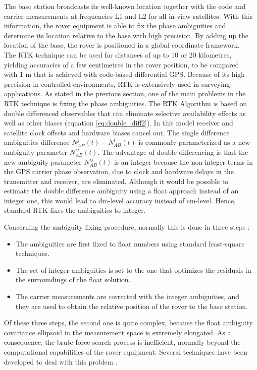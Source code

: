 The base station broadcasts its well-known location together with the code and carrier measurements at frequencies L1 and L2 for all in-view satellites. With this information, the rover equipment is able to fix the phase ambiguities and determine its location relative to the base with high precision. By adding up the location of the base, the rover is positioned in a global coordinate framework.
The RTK technique can be used for distances of up to 10 or 20 kilometres, yielding accuracies of a few centimetres in the rover position, to be compared with 1 m that is achieved with code-based differential GPS. Because of its high precision in controlled environments, RTK is extensively used in surveying applications.
As stated in the previous section, one of the main problems in the RTK technique is fixing the phase ambiguities. The RTK Algorithm is based on double differenced observables that can eliminate selective availability effects as well as other biases (equation \ref{eq:double_diff2}). In this model receiver and satellite clock offsets and hardware biases cancel out. The single difference ambiguities difference $N_{AB}^{j}(t)-N_{AB}^{i}(t)$ is commonly parameterized as a new ambiguity parameter $N_{AB}^{ij}(t)$. The advantage of double differencing is that the new ambiguity parameter $N_{AB}^{ij}(t)$ is an integer because the non-integer terms in the GPS carrier phase observation, due to clock and hardware delays in the transmitter and receiver, are eliminated.
Although it would be possible to estimate the double difference ambiguity using a float approach instead of an integer one, this would lead to dm-level accuracy instead of cm-level. Hence, standard RTK fixes the ambiguities to integer.

Concerning the ambiguity fixing procedure, normally this is done in three steps \cite{Eissfeller:2002}:
\begin{itemize}
\item The ambiguities are first fixed to float numbers using standard least-square techniques.
\item The set of integer ambiguities is set to the one that optimizes the residuals in the surroundings of the float solution.
\item The carrier measurements are corrected with the integer ambiguities, and they are used to obtain the relative position of the rover to the base station.
\end{itemize}

Of these three steps, the second one is quite complex, because the float ambiguity covariance ellipsoid in the measurement space is extremely elongated. As a consequence, the brute-force search process is inefficient, normally beyond the computational capabilities of the rover equipment. Several techniques have been developed to deal with this problem \cite{Laurichesse:2006, Ge:2008, Collins:2008, Teunissen_ar1995, chang2005}.







